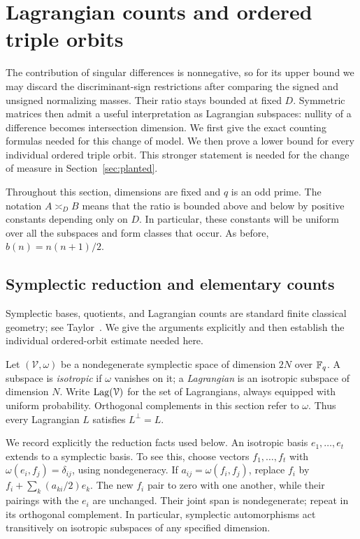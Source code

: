 \section{Lagrangian counts and ordered triple orbits}
\label{sec:orbits}

The contribution of singular differences is nonnegative, so for its upper
bound we may discard the discriminant-sign restrictions after comparing
the signed and unsigned normalizing masses. Their ratio stays bounded
at fixed \(D\). Symmetric matrices then admit a
useful interpretation as Lagrangian subspaces: nullity of a difference becomes
intersection dimension.  We first give the exact counting formulas needed
for this change of model.  We then prove a lower bound for every individual
ordered triple orbit.  This stronger statement is needed for the change of
measure in Section~\ref{sec:planted}.

Throughout this section, dimensions are fixed and $q$ is an odd prime.
The notation $A\asymp_D B$ means that the ratio is bounded above and below
by positive constants depending only on $D$.  In particular, these constants
will be uniform over all the subspaces and form classes that occur.
As before, $b(n)=n(n+1)/2$.

\subsection{Symplectic reduction and elementary counts}

Symplectic bases, quotients, and Lagrangian counts are standard finite
classical geometry; see Taylor~\cite[Theorem~7.4, Lemma~7.5, and Exercises~8.1--8.2]{taylor1992}. We give the arguments
explicitly and then establish the individual ordered-orbit estimate
needed here.

Let $(\mathcal V,\omega)$ be a nondegenerate symplectic space of dimension
$2N$ over $\mathbb F_q$.  A subspace is \emph{isotropic} if $\omega$ vanishes on it;
a \emph{Lagrangian} is an isotropic subspace of dimension $N$.
Write $\operatorname{Lag}(\mathcal V)$ for the set of Lagrangians, always equipped with
uniform probability.  Orthogonal complements in this section refer to
$\omega$.  Thus every Lagrangian $L$ satisfies $L^\perp=L$.

We record explicitly the reduction facts used below.  An isotropic basis
$e_1,\ldots,e_t$ extends to a symplectic basis.  To see this, choose vectors
$f_1,\ldots,f_t$ with $\omega(e_i,f_j)=\delta_{ij}$, using nondegeneracy.
If $a_{ij}=\omega(f_i,f_j)$, replace $f_i$ by
$f_i+\sum_k(a_{ki}/2)e_k$.  The new $f_i$ pair to zero with one another,
while their pairings with the $e_i$ are unchanged.  Their joint span is
nondegenerate; repeat in its orthogonal complement.  In particular,
symplectic automorphisms act transitively on isotropic subspaces of any
specified dimension.


